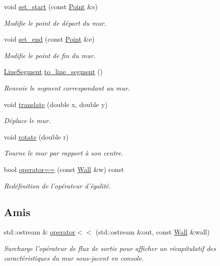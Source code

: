 \begin{DoxyCompactItemize}
\item 
void \hyperlink{classWall_ad11150d7394e06447a697c4e79d47543}{set\+\_\+start} (const \hyperlink{classPoint}{Point} \&s)
\begin{DoxyCompactList}\small\item\em Modifie le point de départ du mur. \end{DoxyCompactList}\item 
void \hyperlink{classWall_a603f23dd306b50d9b2724f83beb61d62}{set\+\_\+end} (const \hyperlink{classPoint}{Point} \&e)
\begin{DoxyCompactList}\small\item\em Modifie le point de fin du mur. \end{DoxyCompactList}\item 
\hyperlink{classLineSegment}{Line\+Segment} \hyperlink{classWall_acb8c8b99d772ce94bf8ef4b249c32fd2}{to\+\_\+line\+\_\+segment} ()
\begin{DoxyCompactList}\small\item\em Renvoie le segment correspondant au mur. \end{DoxyCompactList}\item 
void \hyperlink{classWall_ab9f0416a2272041583bb261345963eed}{translate} (double x, double y)
\begin{DoxyCompactList}\small\item\em Déplace le mur. \end{DoxyCompactList}\item 
void \hyperlink{classWall_ab9ae9b0409c9b88c0d4b156c4e5ee5f5}{rotate} (double r)
\begin{DoxyCompactList}\small\item\em Tourne le mur par rapport à son centre. \end{DoxyCompactList}\item 
bool \hyperlink{classWall_adae0f86f9cef482e5f937fffdd17711d}{operator==} (const \hyperlink{classWall}{Wall} \&w) const 
\begin{DoxyCompactList}\small\item\em Redéfinition de l'opérateur d'égalité. \end{DoxyCompactList}\end{DoxyCompactItemize}
\subsection*{Amis}
\begin{DoxyCompactItemize}
\item 
std\+::ostream \& \hyperlink{classWall_a971cae1df191c5ccfd2ef1f6454a6d11}{operator$<$$<$} (std\+::ostream \&out, const \hyperlink{classWall}{Wall} \&wall)
\begin{DoxyCompactList}\small\item\em Surcharge l'opérateur de flux de sortie pour afficher un récapitulatif des caractéristiques du mur sous-\/jacent en console. \end{DoxyCompactList}\end{DoxyCompactItemize}
